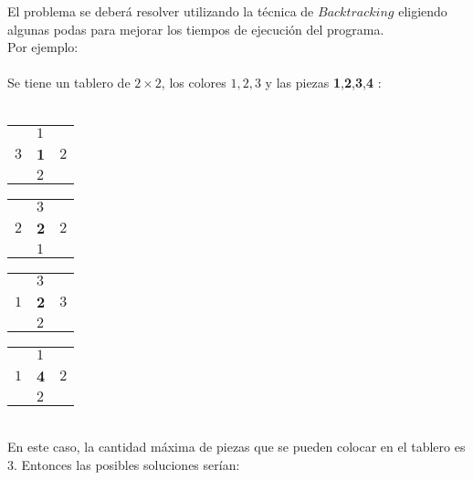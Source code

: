 \documentclass[11pt, a4paper, twoside]{article}
\begin{document}
El problema se deberá resolver utilizando la técnica de $Backtracking$ eligiendo algunas podas para mejorar los tiempos de ejecución del programa. \\

Por ejemplo: \\ 
\\
Se tiene un tablero de $2\times 2$, los colores $1,2,3$ y las piezas \textbf{1},\textbf{2},\textbf{3},\textbf{4} $:$ \\
\\

\begin{minipage}{0.2\textwidth}
	\begin{tabular}{ |l l l|}
		\hline
			 & $1$     &       \\
		$3$  & \textbf{1} &   $2$ \\ 
			 & $2$     &       \\
		\hline
	\end{tabular}
\end{minipage}
\begin{minipage}{0.2\textwidth}
	\begin{tabular}{ |l l l|}
		\hline
			 & $3$     &       \\
		$2$  & \textbf{2} & $2$ \\ 
			 & $1$     &       \\
		\hline
	\end{tabular}
\end{minipage}
\begin{minipage}{0.2\textwidth}
	\begin{tabular}{ |l l l|}
		\hline
			 & $3$      &       \\
		$1$  & \textbf{2}  & $3$ \\ 
			 & $2$      &       \\
		\hline
	\end{tabular}
\end{minipage}
\begin{minipage}{0.2\textwidth}
	\begin{tabular}{ |l l l|}
		\hline
			 & $1$      &       \\
		$1$  & \textbf{4}  & $2$   \\ 
			 & $2$      &       \\
		\hline
	\end{tabular} 
\end{minipage}  \\

En este caso, la cantidad máxima de piezas que se pueden colocar en el tablero es $3$. Entonces las posibles soluciones serían: \\
\end{document}
